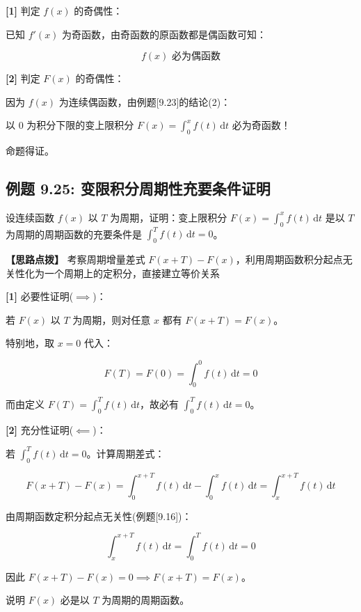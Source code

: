 \documentclass[11pt,a4paper,UTF8]{ctexart}
\begin{document}
\begin{solbox}[分步推导与答题规范]
\textbf{[1]} 判定 $f(x)$ 的奇偶性：

已知 $f'(x)$ 为奇函数，由奇函数的原函数都是偶函数可知：


\begin{equation*}
f(x) \text{ 必为偶函数}
\end{equation*}


\textbf{[2]} 判定 $F(x)$ 的奇偶性：

因为 $f(x)$ 为连续偶函数，由例题[9.23]的结论(2)：

以 0 为积分下限的变上限积分 $F(x) = \int_0^x f(t)\,\mathrm{d}t$ 必为奇函数！

命题得证。
\end{solbox}


\subsection{例题 9.25: 变限积分周期性充要条件证明}

设连续函数 $f(x)$ 以 $T$ 为周期，证明：变上限积分 $F(x) = \int_0^x f(t)\,\mathrm{d}t$ 是以 $T$ 为周期的周期函数的充要条件是 $\int_0^T f(t)\,\mathrm{d}t = 0$。

\textbf{\color{DeepPurple}【思路点拨】} 考察周期增量差式 $F(x+T) - F(x)$，利用周期函数积分起点无关性化为一个周期上的定积分，直接建立等价关系


\begin{solbox}[分步推导与答题规范]
\textbf{[1]} 必要性证明($\implies$)：

若 $F(x)$ 以 $T$ 为周期，则对任意 $x$ 都有 $F(x+T) = F(x)$。

特别地，取 $x=0$ 代入：


\begin{equation*}
F(T) = F(0) = \int_0^0 f(t)\,\mathrm{d}t = 0
\end{equation*}


而由定义 $F(T) = \int_0^T f(t)\,\mathrm{d}t$，故必有 $\int_0^T f(t)\,\mathrm{d}t = 0$。

\textbf{[2]} 充分性证明($\impliedby$)：

若 $\int_0^T f(t)\,\mathrm{d}t = 0$。计算周期差式：


\begin{equation*}
F(x+T) - F(x) = \int_0^{x+T} f(t)\,\mathrm{d}t - \int_0^x f(t)\,\mathrm{d}t = \int_x^{x+T} f(t)\,\mathrm{d}t
\end{equation*}


由周期函数定积分起点无关性(例题[9.16])：


\begin{equation*}
\int_x^{x+T} f(t)\,\mathrm{d}t = \int_0^T f(t)\,\mathrm{d}t = 0
\end{equation*}


因此 $F(x+T) - F(x) = 0 \implies F(x+T) = F(x)$。

说明 $F(x)$ 必是以 $T$ 为周期的周期函数。
\end{solbox}
\end{document}
